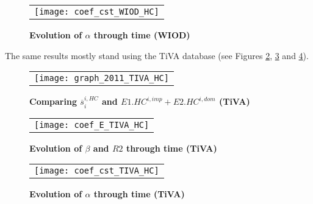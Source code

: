 \documentclass[11pt,a4paper]{article}
\begin{document}
\begin{figure}[!h]
\centering
\caption{\footnotesize{\textbf{Evolution of $\alpha$ through time (WIOD)}}}
\begin{tabular}{c}
\texttt{[image: coef\_cst\_WIOD\_HC]}\\
\end{tabular}
\label{fig:evolution_cst}
\end{figure}


The same results mostly stand using the TiVA database (see Figures \ref{fig:ratiodir_TiVA}, \ref{fig:evolution_b_TiVA} and \ref{fig:evolution_cst_TiVA}).

\begin{figure}[!h]
\centering
\caption{\footnotesize{\textbf{Comparing $\overline{s}_{i}^{i,HC}$ and $E1.HC^{i,imp}+E2.HC^{i,dom}$ (TiVA)}}}
\begin{tabular}{c}
\texttt{[image: graph\_2011\_TIVA\_HC]}\\
\end{tabular}
\label{fig:ratiodir_TiVA}
\end{figure}

\begin{figure}[!h]
\centering
\caption{\footnotesize{\textbf{Evolution of $\beta$ and $R2$ through time (TiVA)}}}
\begin{tabular}{c}
\texttt{[image: coef\_E\_TIVA\_HC]}\\
\end{tabular}
\label{fig:evolution_b_TiVA}
\end{figure}

\begin{figure}[!h]
\centering
\caption{\footnotesize{\textbf{Evolution of $\alpha$ through time (TiVA)}}}
\begin{tabular}{c}
\texttt{[image: coef\_cst\_TIVA\_HC]}\\
\end{tabular}
\label{fig:evolution_cst_TiVA}
\end{figure}
\end{document}
